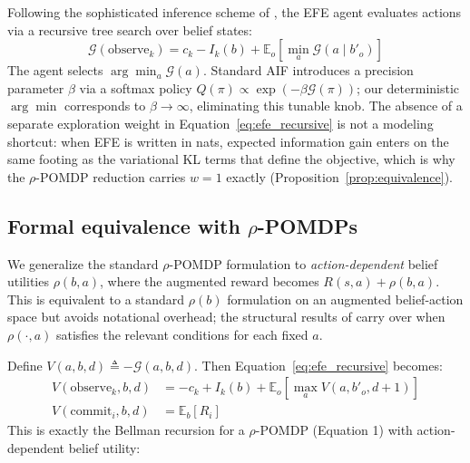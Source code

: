 \documentclass{article}
\begin{document}
Following the sophisticated inference scheme of \citet{friston2021}, the EFE agent evaluates actions via a recursive tree search over belief states:
\begin{equation}
    \mathcal{G}(\text{observe}_k) = c_k - I_k(b) + \mathbb{E}_{o}\!\left[\min_a \mathcal{G}(a \mid b'_o)\right]
    \label{eq:efe_recursive}
\end{equation}
The agent selects $\arg\min_a \mathcal{G}(a)$. Standard AIF introduces a precision parameter $\beta$ via a softmax policy $Q(\pi) \propto \exp(-\beta \mathcal{G}(\pi))$; our deterministic $\arg\min$ corresponds to $\beta \to \infty$, eliminating this tunable knob. The absence of a separate exploration weight in Equation~\ref{eq:efe_recursive} is not a modeling shortcut: when EFE is written in nats, expected information gain enters on the same footing as the variational KL terms that define the objective, which is why the $\rho$-POMDP reduction carries $w{=}1$ exactly (Proposition~\ref{prop:equivalence}).

\subsection{Formal equivalence with $\rho$-POMDPs}
\label{subsec:formal_rho_equiv}

We generalize the standard $\rho$-POMDP formulation to \emph{action-dependent} belief utilities $\rho(b, a)$, where the augmented reward becomes $R(s,a) + \rho(b,a)$. This is equivalent to a standard $\rho(b)$ formulation on an augmented belief-action space but avoids notational overhead; the structural results of \citet{araya2010} carry over when $\rho(\cdot, a)$ satisfies the relevant conditions for each fixed $a$.

Define $V(a, b, d) \triangleq -\mathcal{G}(a, b, d)$. Then Equation~\ref{eq:efe_recursive} becomes:
\begin{align}
    V(\text{observe}_k, b, d) &= -c_k + I_k(b) + \mathbb{E}_o\!\left[\max_a V(a, b'_o, d{+}1)\right] \label{eq:bellman_obs} \\
    V(\text{commit}_i, b, d) &= \mathbb{E}_b[R_i] \label{eq:bellman_commit}
\end{align}
This is exactly the Bellman recursion for a $\rho$-POMDP (Equation 1) with action-dependent belief utility:
\end{document}
